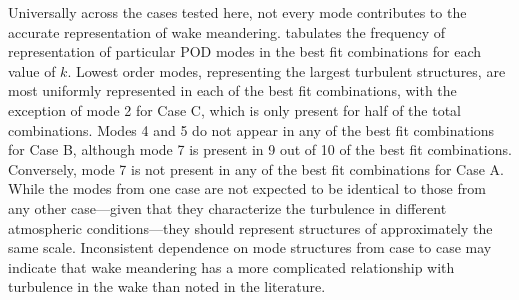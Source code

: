 \documentclass[aip,amsmath,amssymb,preprint,]{revtex4-1}
\begin{document}

Universally across the cases tested here, not every mode contributes to the accurate representation of wake meandering.
 tabulates the frequency of representation of particular POD modes in the best fit combinations for each value of $k$.
Lowest order modes, representing the largest turbulent structures, are most uniformly represented in each of the best fit combinations, with the exception of mode 2 for Case C, which is only present for half of the total combinations.
Modes 4 and 5 do not appear in any of the best fit combinations for Case B, although mode 7 is present in 9 out of 10 of the best fit combinations.
Conversely, mode 7 is not present in any of the best fit combinations for Case A.
While the modes from one case are not expected to be identical to those from any other case---given that they characterize the turbulence in different atmospheric conditions---they should represent structures of approximately the same scale. 
Inconsistent dependence on mode structures from case to case may indicate that wake meandering has a more complicated relationship with turbulence in the wake than noted in the literature. %

\end{document}
